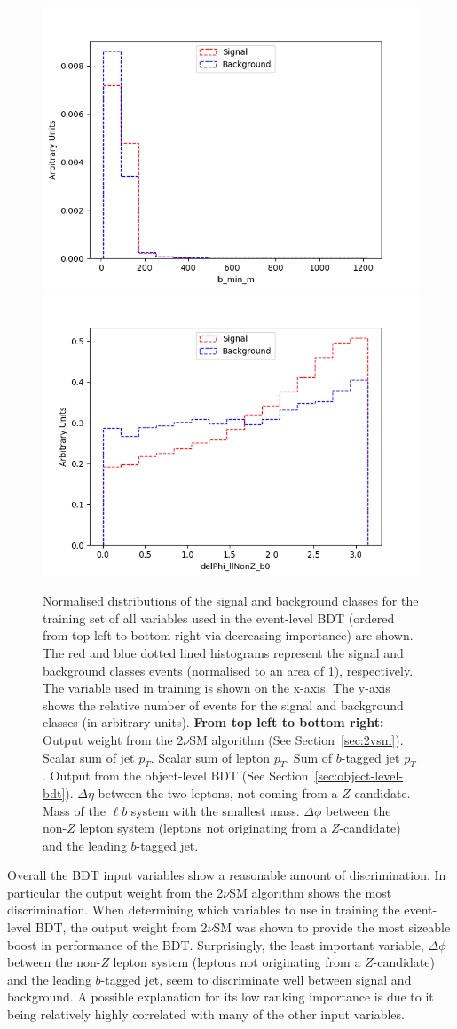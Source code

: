 \begin{figure}
    \includegraphics[width=.3\textwidth]{figures/bdtPlots/normPlot_lb_min_m.png} 
    \includegraphics[width=.3\textwidth]{figures/bdtPlots/normPlot_delPhi_llNonZ_b0.png} 
    
    \caption{Normalised distributions of the signal and background classes for the training set of all variables used in the event-level BDT (ordered from top left to bottom right via decreasing importance) are shown. The red and blue dotted lined histograms represent the signal and background classes events (normalised to an area of 1), respectively. The variable used in training is shown on the x-axis. The y-axis shows the relative number of events for the signal and background classes (in arbitrary units). \textbf{From top left to bottom right:} Output weight from the 2$\nu$SM algorithm (See Section~\ref{sec:2vsm}). Scalar sum of jet $p_{T}$. Scalar sum of lepton $p_{T}$. Sum of $b$-tagged jet $p_{T}$. Output from the object-level BDT (See Section~\ref{sec:object-level-bdt}). $\Delta \eta$ between the two leptons, not coming from a $Z$ candidate. Mass of the $\ell b$ system with the smallest mass. $\Delta \phi$ between the non-$Z$ lepton system (leptons not originating from a $Z$-candidate) and the leading $b$-tagged jet.}
    \label{fig:norm-event-bdt-vars}
\end{figure}

Overall the BDT input variables show a reasonable amount of discrimination. In particular the output weight from the 2$\nu$SM algorithm shows the most discrimination. When determining which variables to use in training the event-level BDT, the output weight from 2$\nu$SM was shown to provide the most sizeable boost in performance of the BDT. Surprisingly, the least important variable, $\Delta \phi$ between the non-$Z$ lepton system (leptons not originating from a $Z$-candidate) and the leading $b$-tagged jet, seem to discriminate well between signal and background. A possible explanation for its low ranking importance is due to it being relatively highly correlated with many of the other input variables.

